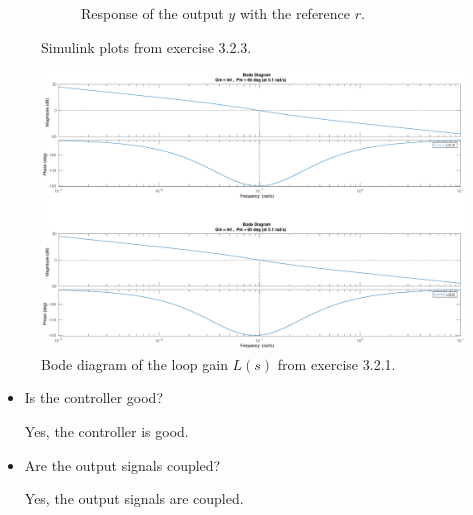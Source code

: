 \documentclass[11pt,a4paper]{article}
\begin{document}
\begin{figure}[!ht]
\begin{subfigure}[t]{.495\linewidth}
		\caption{Response of the output $y$ with the reference $r$.}
		\label{fig:3232}
	\end{subfigure}
	\caption{Simulink plots from exercise 3.2.3.}
	\label{fig:MPSimulink}
\end{figure}
\begin{figure}[!ht]
	\footnotesize
	\centering 
	\includegraphics[width=\textwidth]{321}
	\caption{Bode diagram of the loop gain $L(s)$ from exercise 3.2.1.}
	\label{fig:MPBodeL}
\end{figure}
\begin{itemize}
\item Is the controller good?
\par Yes, the controller is good.

\item Are the output signals coupled?
\par Yes, the output signals are coupled.
\end{itemize}


\end{document}
